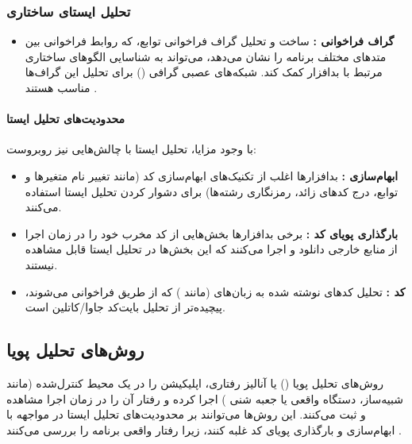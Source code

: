 \subsubsection{تحلیل ایستای ساختاری}
\begin{itemize}
    \item \textbf{گراف فراخوانی :} ساخت و تحلیل گراف فراخوانی توابع، که روابط فراخوانی بین متدهای مختلف برنامه را نشان می‌دهد، می‌تواند به شناسایی الگوهای ساختاری مرتبط با بدافزار کمک کند. شبکه‌های عصبی گرافی () برای تحلیل این گراف‌ها مناسب هستند \cite{Zhu2018}.
\end{itemize}

\paragraph{محدودیت‌های تحلیل ایستا}
با وجود مزایا، تحلیل ایستا با چالش‌هایی نیز روبروست:
\begin{itemize}
    \item \textbf{ابهام‌سازی :} بدافزارها اغلب از تکنیک‌های ابهام‌سازی کد (مانند تغییر نام متغیرها و توابع، درج کدهای زائد، رمزنگاری رشته‌ها) برای دشوار کردن تحلیل ایستا استفاده می‌کنند.
    \item \textbf{بارگذاری پویای کد :} برخی بدافزارها بخش‌هایی از کد مخرب خود را در زمان اجرا از منابع خارجی دانلود و اجرا می‌کنند که این بخش‌ها در تحلیل ایستا قابل مشاهده نیستند.
    \item \textbf{کد :} تحلیل کدهای نوشته شده به زبان‌های  (مانند ) که از طریق  فراخوانی می‌شوند، پیچیده‌تر از تحلیل بایت‌کد جاوا/کاتلین است.
\end{itemize}

\subsection{روش‌های تحلیل پویا}
روش‌های تحلیل پویا () یا آنالیز رفتاری، اپلیکیشن را در یک محیط کنترل‌شده (مانند شبیه‌ساز، دستگاه واقعی یا جعبه شنی ) اجرا کرده و رفتار آن را در زمان اجرا مشاهده و ثبت می‌کنند. این روش‌ها می‌توانند بر محدودیت‌های تحلیل ایستا در مواجهه با ابهام‌سازی و بارگذاری پویای کد غلبه کنند، زیرا رفتار واقعی برنامه را بررسی می‌کنند \cite{AndroidMalwareSurvey}.

